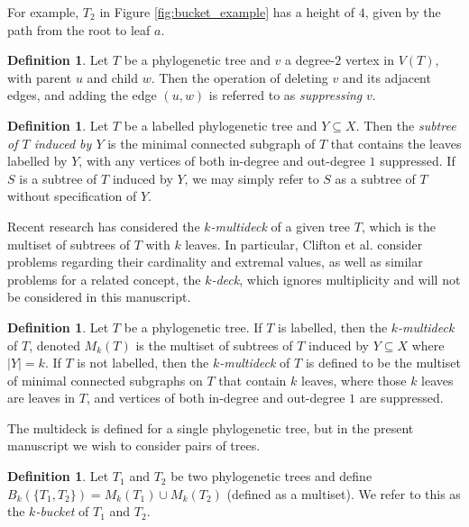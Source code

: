 \documentclass[12pt]{article}
\theoremstyle{definition}
\newtheorem{Definition}[Theorem]{Definition}
\begin{document}
For example, $T_2$ in Figure \ref{fig:bucket_example} has a height of $4$, given by the path from the root to leaf $a$.

\begin{Definition}
    Let $T$ be a phylogenetic tree and $v$ a degree-$2$ vertex in $V(T)$, with parent $u$ and child $w$. Then the operation of deleting $v$ and its adjacent edges, and adding the edge $(u,w)$ is referred to as \emph{suppressing} $v$.
\end{Definition}

\begin{Definition}
    Let $T$ be a labelled phylogenetic tree and $Y \subseteq X$. Then the \emph{subtree of $T$ induced by $Y$} is the minimal connected subgraph of $T$ that contains the leaves labelled by $Y$, with any vertices of both in-degree and out-degree $1$ suppressed. If $S$ is a subtree of $T$ induced by $Y$, we may simply refer to $S$ as a subtree of $T$ without specification of $Y$.
\end{Definition}

Recent research has considered the \emph{$k$-multideck} of a given tree $T$, which is the multiset of subtrees of $T$ with $k$ leaves. In particular, Clifton et al. \cite{Decks_of_rooted_binary_trees} consider problems regarding their cardinality and extremal values, as well as similar problems for a related concept, the \emph{$k$-deck}, which ignores multiplicity and will not be considered in this manuscript.

\begin{Definition}
    Let $T$ be a phylogenetic tree. If $T$ is labelled, then the \emph{$k$-multideck} of $T$, denoted $M_k(T)$ is the multiset of subtrees of $T$ induced by $Y \subseteq X$ where $|Y|=k$. If $T$ is not labelled, then the \emph{$k$-multideck} of $T$ is defined to be the multiset of minimal connected subgraphs on $T$ that contain $k$ leaves, where those $k$ leaves are leaves in $T$, and vertices of both in-degree and out-degree $1$ are suppressed.
\end{Definition}

The multideck is defined for a single phylogenetic tree, but in the present manuscript we wish to consider pairs of trees.

\begin{Definition}
    Let $T_1$ and $T_2$ be two phylogenetic trees and define $B_k(\{T_1,T_2\}) = M_k(T_1) \cup M_k(T_2)$ (defined as a multiset). We refer to this as the \emph{$k$-bucket} of $T_1$ and $T_2$.
\end{Definition}
\end{document}
